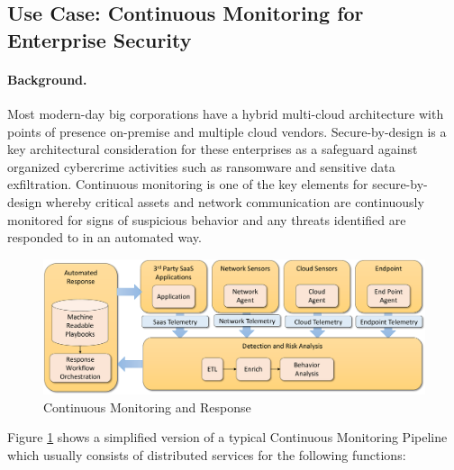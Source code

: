 \subsection{Use Case: Continuous Monitoring for Enterprise Security}


\paragraph*{Background.}
Most modern-day big corporations have a hybrid multi-cloud architecture 
with points of presence on-premise and multiple cloud vendors. 
Secure-by-design is a key architectural consideration for these 
enterprises as a safeguard against organized cybercrime activities 
such as ransomware and sensitive data exfiltration. Continuous monitoring 
is one of the key elements for secure-by-design whereby critical 
assets and network communication are continuously monitored for signs 
of suspicious behavior and any threats identified are responded to in an automated way.

\begin{figure}[htb]
\centering\includegraphics[width=0.8\columnwidth]{usecase/images/nist-security.pdf}

\caption{Continuous Monitoring and Response}
\label{fig:sec-general}
\end{figure}

Figure \ref{fig:sec-general} shows a simplified version of a typical 
Continuous Monitoring Pipeline which usually consists of distributed services for the following functions:

